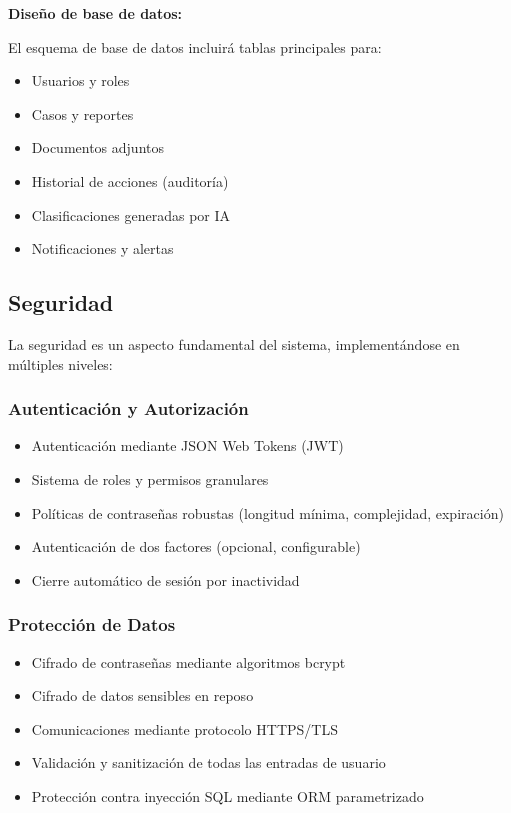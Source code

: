 \documentclass[12pt,letterpaper]{article}
\begin{document}
\textbf{Diseño de base de datos:}

El esquema de base de datos incluirá tablas principales para:

\begin{itemize}
    \item Usuarios y roles
    \item Casos y reportes
    \item Documentos adjuntos
    \item Historial de acciones (auditoría)
    \item Clasificaciones generadas por IA
    \item Notificaciones y alertas
\end{itemize}

\subsection{Seguridad}

La seguridad es un aspecto fundamental del sistema, implementándose en múltiples niveles:

\subsubsection{Autenticación y Autorización}

\begin{itemize}
    \item Autenticación mediante JSON Web Tokens (JWT)
    \item Sistema de roles y permisos granulares
    \item Políticas de contraseñas robustas (longitud mínima, complejidad, expiración)
    \item Autenticación de dos factores (opcional, configurable)
    \item Cierre automático de sesión por inactividad
\end{itemize}

\subsubsection{Protección de Datos}

\begin{itemize}
    \item Cifrado de contraseñas mediante algoritmos bcrypt
    \item Cifrado de datos sensibles en reposo
    \item Comunicaciones mediante protocolo HTTPS/TLS
    \item Validación y sanitización de todas las entradas de usuario
    \item Protección contra inyección SQL mediante ORM parametrizado
\end{itemize}
\end{document}

